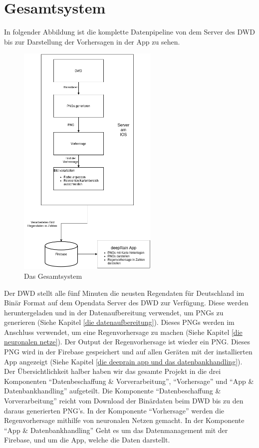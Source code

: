 \section{Gesamtsystem}\label{gesamtsystem}
In folgender Abbildung ist die komplette Datenpipeline von dem Server des DWD bis zur Darstellung der Vorhersagen in der App zu sehen.  

\begin{figure}[htb]
 \centering
 \includegraphics[width=0.6\textwidth,angle=0]{abb/Gesamtsystem}
 \caption[Das Gesamtsystem]{Das Gesamtsystem}
\label{fig:Beschreibung}
\end{figure}
\begin{sloppypar}
    \noindent
    Der DWD stellt alle fünf Minuten die neusten Regendaten für Deutschland im Binär Format auf dem Opendata Server des DWD zur Verfügung. 
    Diese werden heruntergeladen und in der Datenaufbereitung verwendet, um PNGs zu generieren (Siehe Kapitel \ref{die datenaufbereitung}). 
    Dieses PNGs werden im Anschluss verwendet, um eine Regenvorhersage zu machen (Siehe Kapitel \ref{die neuronalen netze}). 
    Der Output der Regenvorhersage ist wieder ein PNG. 
    Dieses PNG wird in der Firebase gespeichert und auf allen Geräten mit der installierten App angezeigt (Siehe Kapitel \ref{die deeprain app und das datenbankhandling}). 
    Der Übersichtlichkeit halber haben wir das gesamte Projekt in die drei Komponenten “Datenbeschaffung \& Vorverarbeitung”, “Vorhersage” und
    “App \& Datenbankhandling” aufgeteilt. 
    Die Komponente “Datenbeschaffung \& Vorverarbeitung” reicht vom Download der Binärdaten beim DWD bis zu den daraus generierten PNG’s. 
    In der Komponente “Vorhersage” werden die Regenvorhersage mithilfe von neuronalen Netzen gemacht. In der Komponente “App \& Datenbankhandling” 
    Geht es um das Datenmanagement mit der Firebase, und um die App, welche die Daten darstellt.
\end{sloppypar}